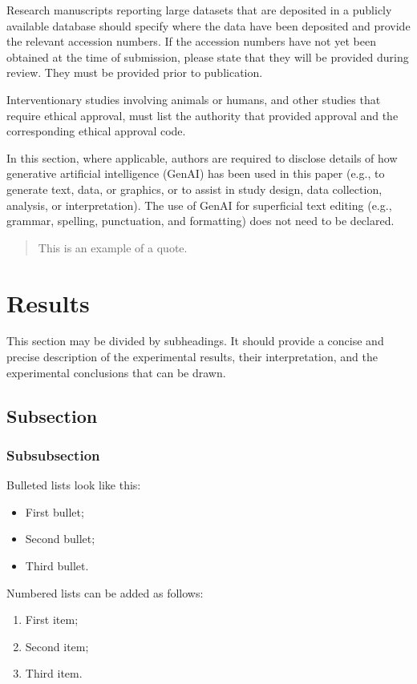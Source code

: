 \documentclass[journal,article,submit,moreauthors]{Definitions/mdpi}
\begin{document}
Research manuscripts reporting large datasets that are deposited in a publicly available database should specify where the data have been deposited and provide the relevant accession numbers. If the accession numbers have not yet been obtained at the time of submission, please state that they will be provided during review. They must be provided prior to publication.

Interventionary studies involving animals or humans, and other studies that require ethical approval, must list the authority that provided approval and the corresponding ethical approval code.

In this section, where applicable, authors are required to disclose details of how generative artificial intelligence (GenAI) has been used in this paper (e.g., to generate text, data, or graphics, or to assist in study design, data collection, analysis, or interpretation). The use of GenAI for superficial text editing (e.g., grammar, spelling, punctuation, and formatting) does not need to be declared.

\begin{quote}
This is an example of a quote.
\end{quote}

\section{Results}

This section may be divided by subheadings. It should provide a concise and precise description of the experimental results, their interpretation, and the experimental conclusions that can be drawn.

\subsection{Subsection}
\subsubsection{Subsubsection}

Bulleted lists look like this:
\begin{itemize}
\item	First bullet;
\item	Second bullet;
\item	Third bullet.
\end{itemize}

Numbered lists can be added as follows:
\begin{enumerate}
\item	First item; 
\item	Second item;
\item	Third item.
\end{enumerate}
\end{document}
